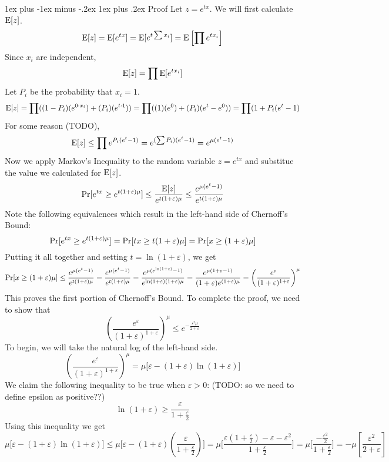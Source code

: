 \documentclass[11pt]{article}
\makeatletter
\renewcommand{\subsubsection}{\@startsection{subsubsection}{3}{0mm}%
                                   {1ex plus -1ex minus -.2ex}%
                                   {1ex plus .2ex}%
                                   {\normalfont\normalsize\bfseries}}
\newcommand{\pr}{{\bf {\rm Pr}}}
\newcommand{\expc}{{\bf {\rm E}}}
\makeatother
\begin{document}
\subsubsection{Proof}
Let $z = e^{tx}$. We will first calculate $\expc[z]$.
\[ \expc[z] = \expc[e^{tx}] = \expc[e^{t \sum x_i}] = \expc\left[\prod e^{t x_i}\right] \]
Since $x_i$ are independent,
\[ \expc[z] = \prod \expc[e^{t x_i}] \]
Let $P_i$ be the probability that $x_i = 1$.
\[ \expc[z] = \prod ((1 - P_i)(e^{0 \cdot x_i}) + (P_i)(e^{t \cdot 1})) = \prod ((1)(e^0) + (P_i)(e^t - e^0)) = \prod (1 + P_i(e^t - 1)  \]
For some reason (TODO),
\[ \expc[z] \leq \prod e^{P_i(e^t - 1)} = e^{(\sum P_i)(e^t - 1)} = e^{\mu(e^t - 1)} \]
Now we apply Markov's Inequality to the random variable $z = e^{tx}$ and substitue the value we calculated for $\expc[z]$.
\[ \pr [e^{tx} \geq e^{t(1+\varepsilon)\mu}] \leq \frac{\expc[z]}{e^{t(1+\varepsilon)\mu}} \leq \frac{e^{\mu(e^t - 1)}}{e^{t(1+\varepsilon)\mu}} \]
Note the following equivalences which result in the left-hand side of Chernoff's Bound:
\[ \pr [e^{tx} \geq e^{t(1+\varepsilon)\mu}] = \pr [tx \geq t(1+\varepsilon)\mu] = \pr [x \geq (1+\varepsilon)\mu] \]
Putting it all together and setting $t = \ln (1 + \varepsilon)$, we get 
\[ \pr [x \geq (1+\varepsilon)\mu] \leq \frac{e^{\mu(e^t - 1)}}{e^{t(1+\varepsilon)\mu}}  = \frac{e^{\mu(e^t - 1)}}{e^{t(1+\varepsilon)\mu}}  = \frac{e^{\mu(e^{\ln (1 + \varepsilon)} - 1)}}{e^{\ln (1 + \varepsilon)(1+\varepsilon)\mu}} = \frac{e^{\mu(1 + \varepsilon - 1)}}{(1 + \varepsilon)e^{(1+\varepsilon)\mu}} = \left(\frac{e^\varepsilon}{(1+\varepsilon)^{1+\varepsilon}} \right)^\mu \]
This proves the first portion of Chernoff's Bound. To complete the proof, we need to show that
\[ \left(\frac{e^\varepsilon}{(1+\varepsilon)^{1+\varepsilon}}\right)^\mu \leq e^{-\frac{\varepsilon^2 \mu}{2+\varepsilon}} \]
To begin, we will take the natural log of the left-hand side.
\[ \left(\frac{e^\varepsilon}{(1+\varepsilon)^{1+\varepsilon}}\right)^\mu = \mu\pmb{[}\varepsilon - (1 + \varepsilon)\ln (1 + \varepsilon)\pmb{]} \]
We claim the following inequality to be true when $\varepsilon > 0$: (TODO: so we need to define epsilon as positive??)
\[ \ln (1 + \varepsilon) \geq \frac{\varepsilon}{1 + \frac{\varepsilon}{2}} \]
Using this inequality we get
\[ \mu \pmb{[}\varepsilon - (1 + \varepsilon)\ln (1 + \varepsilon)\pmb{]} \leq \mu \pmb{[}\varepsilon - (1 + \varepsilon)(\frac{\varepsilon}{1 + \frac{\varepsilon}{2}})\pmb{]} = \mu \pmb{[} \frac{\varepsilon(1 + \frac{\varepsilon}{2}) - \varepsilon - \varepsilon^2}{1 + \frac{\varepsilon}{2}}  \pmb{]} = \mu \pmb{[} \frac{-\frac{\varepsilon^2}{2}}{1 + \frac{\varepsilon}{2}}  \pmb{]} = - \mu \left[ \frac{\varepsilon^2}{2 + \varepsilon} \right] \]
\end{document}
